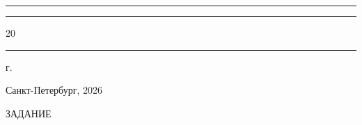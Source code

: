 \documentclass[areasetadvanced]{scrartcl}
\begin{document}
        \vspace{0.5cm}
        
        \begin{flushright}
        
        \guillemotleft \rule[0pt]{0.8cm}{0.5pt}\guillemotright \rule[0pt]{2cm}{0.5pt} 20\rule[0pt]{0.5cm}{0.5pt} г.
        
        \end{flushright}
        
        \vfill
        
        \begin{center}
        
        Санкт-Петербург, 2026
        
        \end{center}

\newpage
\par\noindent
{\centering
{}ЗАДАНИЕ\par
\vspace{1.5ex}
}
\noindent
\end{document}
